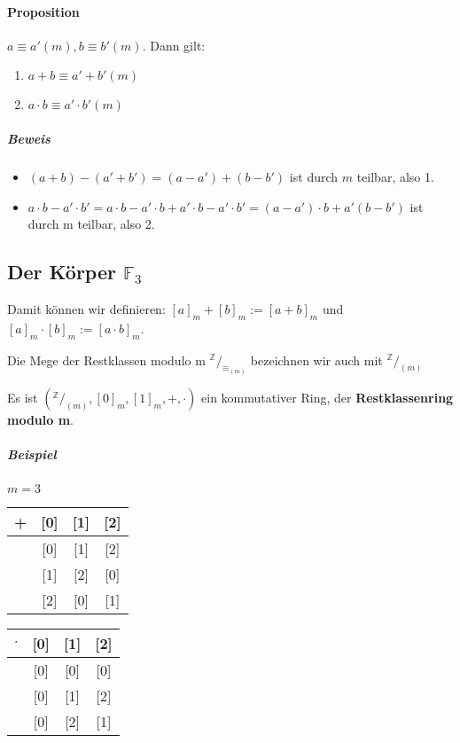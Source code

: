 \documentclass[14pt,a4paper]{article}
\newcommand*\rfrac[2]{{}^{#1}\!/_{#2}}
\newcommand{\Z}{\ensuremath{\mathbb{Z}}}
\begin{document}
  \paragraph{Proposition}
  $ a \equiv a' (m), b \equiv b' (m)$.
  Dann gilt:
  \begin{enumerate}
    \item $ a + b \equiv a' + b' (m) $
    \item $a \cdot b \equiv a' \cdot b' (m) $
  \end{enumerate}

  \subparagraph{Beweis}
  \begin{itemize}
    \item $ (a+b) - (a' + b') = (a - a') + (b - b')$ ist durch $m$ teilbar, also 1.
    \item $ a \cdot b - a' \cdot b' = a \cdot b - a' \cdot b + a'\cdot b - a'
      \cdot b' = (a - a') \cdot b + a'(b - b') $ ist durch m teilbar, also 2.
  \end{itemize}

  \subsection{Der Körper $\mathbb{F}_3$}

  Damit können wir definieren: $ [a]_m + [b]_m := [a + b]_m$ und $[a]_m \cdot [b]_m
  := [ a \cdot b ]_m$.

  Die Mege der Restklassen modulo m $ \rfrac{\Z}{\equiv_{(m)}} $ bezeichnen wir auch
  mit $ \rfrac{\Z}{(m)}$

  Es ist $ \left( \rfrac{\Z}{(m)}, [0]_m, [1]_m, +, \cdot \right) $ ein kommutativer Ring,
  der \textbf{Restklassenring modulo m}.

  \subparagraph{Beispiel}
  $m=3$

  \begin{tabular}{c || c | c | c}
     +  & [0] & [1] & [2] \\ \hline \hline
    [0] & [0] & [1] & [2] \\ \hline
    [1] & [1] & [2] & [0] \\ \hline
    [2] & [2] & [0] & [1]
  \end{tabular}
  \begin{tabular}{c || c | c | c}
    $\cdot$ & [0] & [1] & [2] \\ \hline \hline
    [0] & [0] & [0] & [0] \\ \hline
    [1] & [0] & [1] & [2] \\ \hline
    [2] & [0] & [2] & [1]
  \end{tabular}
\end{document}

